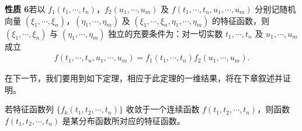 \documentclass[../../main.tex]{subfiles}
\begin{document}
\noindent\textbf{性质 6}\quad 若以 $f_1(t_1,\cdots,t_n)$，$f_2(u_1,\cdots,u_m)$ 及 $f(t_1,\cdots,t_n,u_1,\cdots,u_m)$ 分别记随机向量 $(\xi_1,\cdots,\xi_n)$，$(\eta_1,\cdots,\eta_m)$ 及 $(\xi_1,\cdots,\xi_n,\eta_1,\cdots,\eta_m)$ 的特征函数，则 $(\xi_1,\cdots,\xi_n)$ 与 $(\eta_1,\cdots,\eta_m)$ 独立的充要条件为：对一切实数 $t_1,\cdots,t_n$ 及 $u_1,\cdots,u_m$ 成立
\begin{align}
f(t_1,\cdots,t_n,u_1,\cdots,u_m)=f_1(t_1,\cdots,t_n)f_2(u_1,\cdots,u_m).\label{align:ch04-随机向量独立特征函数}
\end{align}

在下一节，我们要用到如下定理，相应于此定理的一维结果，将在下章叙述并证明。

\begin{theorem}[连续性定理]\label{theorem:ch04-连续性定理}
若特征函数列 $\{f_k(t_1,t_2,\cdots,t_n)\}$ 收敛于一个连续函数 $f(t_1,t_2,\cdots,t_n)$，则函数 $f(t_1,t_2,\cdots,t_n)$ 是某分布函数所对应的特征函数。
\end{theorem}
\end{document}
